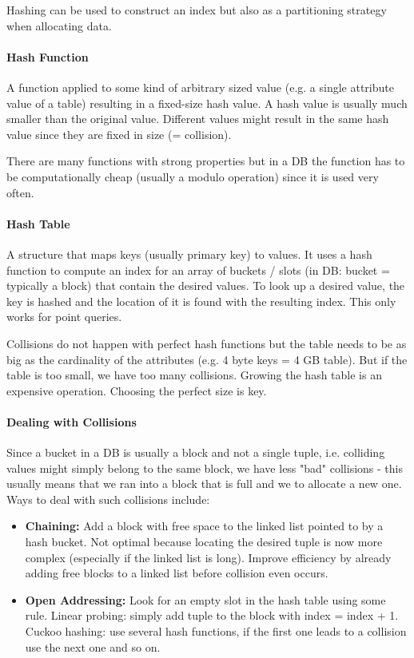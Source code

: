 Hashing can be used to construct an index but also as a partitioning strategy when allocating data.

\paragraph{Hash Function}
A function applied to some kind of arbitrary sized value (e.g. a single attribute value of a table) resulting in a fixed-size hash value. A hash value is usually much smaller than the original value. Different values might result in the same hash value since they are fixed in size (= collision).

There are many functions with strong properties but in a DB the function has to be computationally cheap (usually a modulo operation) since it is used very often.

\paragraph{Hash Table}
A structure that maps keys (usually primary key) to values. It uses a hash function to compute an index for an array of buckets / slots (in DB: bucket = typically a block) that contain the desired values. To look up a desired value, the key is hashed and the location of it is found with the resulting index. This only works for point queries.

Collisions do not happen with perfect hash functions but the table needs to be as big as the cardinality of the attributes (e.g. 4 byte keys = 4 GB table). But if the table is too small, we have too many collisions. Growing the hash table is an expensive operation. Choosing the perfect size is key.

\paragraph{Dealing with Collisions}
Since a bucket in a DB is usually a block and not a single tuple, i.e. colliding values might simply belong to the same block, we have less "bad" collisions - this usually means that we ran into a block that is full and we to allocate a new one. Ways to deal with such collisions include:

\begin{itemize}
    \item \textbf{Chaining:} Add a block with free space to the linked list pointed to by a hash bucket. Not optimal because locating the desired tuple is now more complex (especially if the linked list is long). Improve efficiency by already adding free blocks to a linked list before collision even occurs.
    \item \textbf{Open Addressing:} Look for an empty slot in the hash table using some rule. Linear probing: simply add tuple to the block with index = index + 1. Cuckoo hashing: use several hash functions, if the first one leads to a collision use the next one and so on.
\end{itemize}

